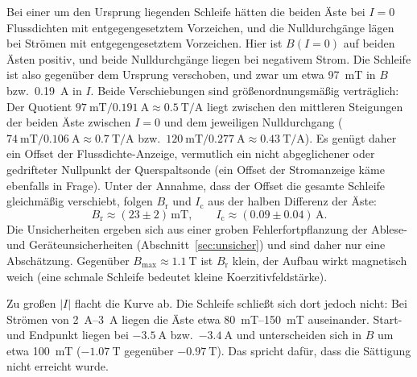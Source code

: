 \documentclass[a4paper,11pt]{article}
\begin{document}
Bei einer um den Ursprung liegenden Schleife hätten die beiden Äste bei $I=0$
Flussdichten mit entgegengesetztem Vorzeichen, und die Nulldurchgänge lägen bei
Strömen mit entgegengesetztem Vorzeichen. Hier ist $B(I{=}0)$ auf beiden Ästen
positiv, und beide Nulldurchgänge liegen bei negativem Strom. Die Schleife ist
also gegenüber dem Ursprung verschoben, und zwar um etwa \SI{97}{\milli\tesla}
in $B$ bzw.\ \SI{0.19}{\ampere} in $I$. Beide Verschiebungen sind
größenordnungsmäßig verträglich: Der Quotient
$\SI{97}{\milli\tesla}/\SI{0.191}{\ampere}\approx\SI{0.5}{\tesla\per\ampere}$
liegt zwischen den mittleren Steigungen der beiden Äste zwischen $I=0$ und dem
jeweiligen Nulldurchgang ($\SI{74}{\milli\tesla}/\SI{0.106}{\ampere}\approx
\SI{0.7}{\tesla\per\ampere}$ bzw.\ $\SI{120}{\milli\tesla}/\SI{0.277}{\ampere}
\approx\SI{0.43}{\tesla\per\ampere}$). Es genügt daher ein Offset der
Flussdichte-Anzeige, vermutlich ein nicht abgeglichener oder gedrifteter
Nullpunkt der Querspaltsonde (ein Offset der Stromanzeige käme ebenfalls in
Frage). Unter der Annahme, dass der Offset die gesamte Schleife gleichmäßig
verschiebt, folgen $B_\mathrm{r}$ und $I_\mathrm{c}$ aus der halben Differenz
der Äste:
\begin{equation}
  B_\mathrm{r}\approx(23\pm2)\,\si{\milli\tesla},\qquad
  I_\mathrm{c}\approx(0.09\pm0.04)\,\si{\ampere}.
\end{equation}
Die Unsicherheiten ergeben sich aus einer groben Fehlerfortpflanzung der
Ablese- und Geräteunsicherheiten (Abschnitt~\ref{sec:unsicher}) und sind daher
nur eine Abschätzung. Gegenüber $B_\mathrm{max}\approx\SI{1.1}{\tesla}$ ist
$B_\mathrm{r}$ klein, der Aufbau wirkt magnetisch weich (eine schmale Schleife
bedeutet kleine Koerzitivfeldstärke).

Zu großen $|I|$ flacht die Kurve ab. Die Schleife schließt sich dort jedoch
nicht: Bei Strömen von \SIrange{2}{3}{\ampere} liegen die Äste etwa
\SIrange{80}{150}{\milli\tesla} auseinander. Start- und Endpunkt liegen bei
$-\SI{3.5}{\ampere}$ bzw.\ $-\SI{3.4}{\ampere}$ und unterscheiden sich in $B$ um
etwa \SI{100}{\milli\tesla} ($-\SI{1.07}{\tesla}$ gegenüber
$-\SI{0.97}{\tesla}$). Das spricht dafür, dass die Sättigung nicht erreicht
wurde.
\end{document}
